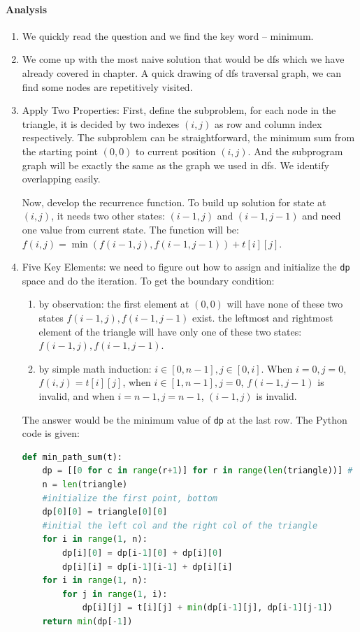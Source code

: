 \documentclass[../main.tex]{subfiles}
\begin{document}
\paragraph{Analysis}
\begin{enumerate}
    \item We quickly read the question and we find the key word -- minimum.
    \item We come up with the most naive solution that would be dfs which we have already covered in chapter. A quick drawing of dfs traversal graph, we can find some nodes are repetitively visited. 
    \item Apply Two Properties: First, define the subproblem, for each node in the triangle, it is decided by two indexes $(i, j)$ as row and column index respectively. The subproblem can be straightforward, the minimum sum from the starting point $(0, 0)$ to current position $(i, j)$. And the subprogram graph will be exactly the same as the graph we used in dfs. We identify overlapping easily. 
    
    Now, develop the recurrence function. To build up solution for state at $(i, j)$, it needs two other states: $(i-1, j)$ and $(i-1, j-1)$ and need one value from current state. The function will be: $f(i, j)=\min(f(i-1, j), f(i-1, j-1)) + t[i][j]$.
    \item Five Key Elements: we need to figure out how to assign and initialize the \texttt{dp} space and do the iteration. To get the boundary condition:
    \begin{enumerate}
        \item by observation: the first element at $(0, 0)$ will have none of these two states $f(i-1, j), f(i-1, j-1)$ exist. the leftmost and rightmost element of the triangle will have only one of these two states: $f(i-1, j), f(i-1, j-1)$. 
        \item by simple math induction: $i \in [0, n-1], j \in [0, i]$. When $i=0, j=0$, $f(i, j)=t[i][j]$, when $i \in [1, n-1], j=0$, $f(i-1, j-1)$ is invalid, and when $i=n-1, j=n-1$, $(i-1, j)$ is invalid.
    \end{enumerate}
    The answer would be the minimum value of \texttt{dp} at the last row.
    The Python code is given:
    
    \begin{lstlisting}[language = Python]
def min_path_sum(t):
    dp = [[0 for c in range(r+1)] for r in range(len(triangle))] # initialized to 0 for f()
    n = len(triangle)
    #initialize the first point, bottom
    dp[0][0] = triangle[0][0]
    #initial the left col and the right col of the triangle
    for i in range(1, n):
        dp[i][0] = dp[i-1][0] + dp[i][0]
        dp[i][i] = dp[i-1][i-1] + dp[i][i]
    for i in range(1, n):
        for j in range(1, i):
            dp[i][j] = t[i][j] + min(dp[i-1][j], dp[i-1][j-1])
    return min(dp[-1])
\end{lstlisting}
\end{enumerate}
\end{document}

